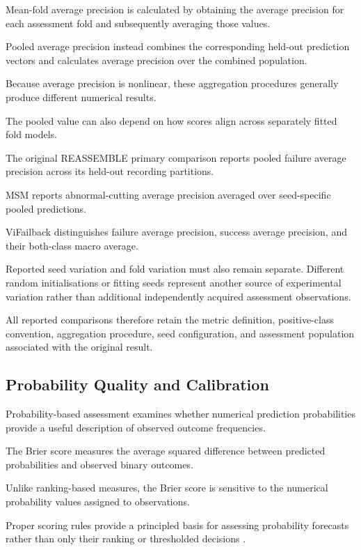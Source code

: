 Mean-fold average precision is calculated by obtaining the average precision for each assessment fold and subsequently averaging those values.

Pooled average precision instead combines the corresponding held-out prediction vectors and calculates average precision over the combined population.

Because average precision is nonlinear, these aggregation procedures generally produce different numerical results.

The pooled value can also depend on how scores align across separately fitted fold models.

The original REASSEMBLE primary comparison reports pooled failure average precision across its held-out recording partitions.

MSM reports abnormal-cutting average precision averaged over seed-specific pooled predictions.

ViFailback distinguishes failure average precision, success average precision, and their both-class macro average.

Reported seed variation and fold variation must also remain separate. Different random initialisations or fitting seeds represent another source of experimental variation rather than additional independently acquired assessment observations.

All reported comparisons therefore retain the metric definition, positive-class convention, aggregation procedure, seed configuration, and assessment population associated with the original result.

\subsection{Probability Quality and Calibration}

Probability-based assessment examines whether numerical prediction probabilities provide a useful description of observed outcome frequencies.

The Brier score measures the average squared difference between predicted probabilities and observed binary outcomes.

Unlike ranking-based measures, the Brier score is sensitive to the numerical probability values assigned to observations.

Proper scoring rules provide a principled basis for assessing probability forecasts rather than only their ranking or thresholded decisions \parencite{P055}.

